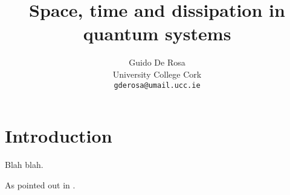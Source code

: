 \documentclass{article}
\title{Space, time and dissipation in quantum systems}
\author{Guido De Rosa\\
  \small{University College Cork}\\
  \small{\texttt{gderosa@umail.ucc.ie}}
}
\begin{document}
\maketitle

\section{Introduction}

Blah blah.

As pointed out in \cite{Gao}.

\printbibliography
\end{document}
